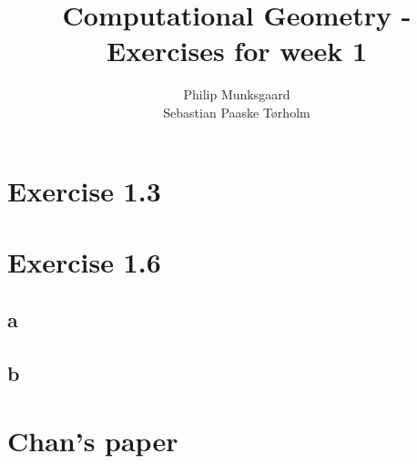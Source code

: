 \documentclass[11pt,a4paper]{article}
\title{Computational Geometry - Exercises for week 1}
\author{Philip Munksgaard\\Sebastian Paaske Tørholm}
\begin{document}
\maketitle

\section{Exercise 1.3}

\section{Exercise 1.6}

\subsection{a}

\subsection{b}

\section{Chan's paper}
\end{document}
